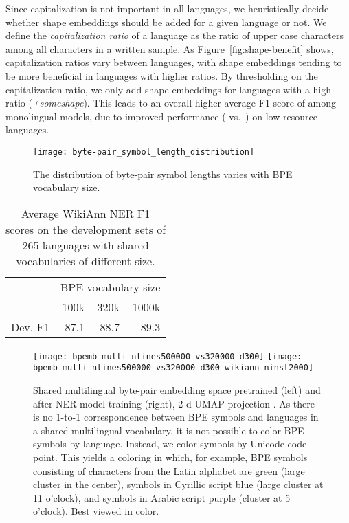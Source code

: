 \documentclass[11pt,a4paper]{article}
\begin{document}
Since capitalization is not important in all languages, we heuristically decide whether shape embeddings should be added for a given language or not.
We define the \emph{capitalization ratio} of a language as the ratio of upper case characters among all characters in a written sample.
As Figure~\ref{fig:shape-benefit} shows, capitalization ratios vary between languages, with shape embeddings tending to be more beneficial in languages with higher ratios.
By thresholding on the capitalization ratio, we only add shape embeddings for languages with a high ratio (\emph{+someshape}).
This leads to an overall higher average F1 score of  among monolingual models, due to improved performance ( vs.\ ) on low-resource languages.

\begin{figure}
	\texttt{[image: byte-pair\_symbol\_length\_distribution]}
	\vspace{-7mm}
	\caption{The distribution of byte-pair symbol lengths varies with BPE vocabulary size.}
	\label{fig:bpe-length}
\end{figure}

\begin{table}
	\centering
	\small
	\begin{tabular}{lrrr}
		\toprule
		 & \multicolumn{3}{c}{BPE vocabulary size} \\
		 & 100k & 320k & 1000k \\
		\midrule
Dev. F1 & 87.1 & 88.7 & 89.3 \\
		\bottomrule
	\end{tabular}
	\caption{Average WikiAnn NER F1 scores on the development sets of 265 languages with shared vocabularies of different size.}
	\label{tbl:bpe-vocab-size}
\end{table}

\begin{figure*}
	\centering
	\texttt{[image: bpemb\_multi\_nlines500000\_vs320000\_d300]}
	\qquad \qquad
	\texttt{[image: bpemb\_multi\_nlines500000\_vs320000\_d300\_wikiann\_ninst2000]}
	\vspace{-1.5ex}
	\caption{Shared multilingual byte-pair embedding space pretrained (left) and after NER model training (right), 2-d UMAP projection \citep{mcinnes2018umap}. As there is no 1-to-1 correspondence between BPE symbols and languages in a shared multilingual vocabulary, it is not possible to color BPE symbols by language.
Instead, we color symbols by Unicode code point.
This yields a coloring in which, for example, BPE symbols consisting of characters from the Latin alphabet are green (large cluster in the center), symbols in Cyrillic script blue (large cluster at 11 o'clock), and symbols in Arabic script purple (cluster at 5 o'clock). Best viewed in color.}
	\label{fig:multi-emb-training}
\end{figure*}
\end{document}
